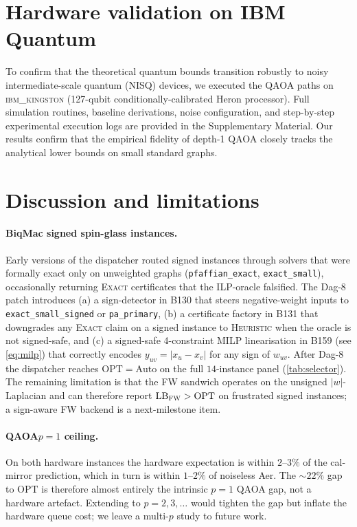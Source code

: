 \documentclass{article}
\theoremstyle{definition}
\theoremstyle{remark}
\newcommand{\QAOA}{\textsc{QAOA}\xspace}
\newcommand{\ILP}{\textsc{ILP}\xspace}
\newcommand{\FW}{\textsc{FW}\xspace}
\newcommand{\OPT}{\mathrm{OPT}}
\newcommand{\LB}{\mathrm{LB}}
\begin{document}
\section{Hardware validation on IBM Quantum}
\label{sec:hardware}
To confirm that the theoretical quantum bounds transition robustly to noisy intermediate-scale quantum (NISQ) devices, we executed the \QAOA paths on \textsc{ibm\_kingston} (127-qubit conditionally-calibrated Heron processor). Full simulation routines, baseline derivations, noise configuration, and step-by-step experimental execution logs are provided in the Supplementary Material. Our results confirm that the empirical fidelity of depth-1 QAOA closely tracks the analytical lower bounds on small standard graphs.

\section{Discussion and limitations}
\label{sec:discussion}

\paragraph{BiqMac signed spin-glass instances.} Early versions of the
dispatcher routed signed instances through solvers that were formally
exact only on unweighted graphs (\texttt{pfaffian\_exact},
\texttt{exact\_small}), occasionally returning \textsc{Exact}
certificates that the \ILP-oracle falsified. The Dag-8 patch introduces
(a) a sign-detector in B130 that steers negative-weight inputs to
\texttt{exact\_small\_signed} or \texttt{pa\_primary}, (b) a certificate
factory in B131 that downgrades any \textsc{Exact} claim on a signed
instance to \textsc{Heuristic} when the oracle is not signed-safe, and
(c) a signed-safe 4-constraint MILP linearisation in B159 (see
\cref{eq:milp}) that correctly encodes $y_{uv} = |x_u - x_v|$ for any
sign of $w_{uv}$. After Dag-8 the dispatcher reaches
$\OPT = \text{Auto}$ on the full $14$-instance panel
(\cref{tab:selector}). The remaining limitation is that the FW sandwich
operates on the unsigned $|w|$-Laplacian and can therefore report
$\LB_{\FW} > \OPT$ on frustrated signed instances; a sign-aware FW
backend is a next-milestone item.

\paragraph{\QAOA $p{=}1$ ceiling.} On both hardware instances the
hardware expectation is within $2$--$3\%$ of the cal-mirror prediction,
which in turn is within $1$--$2\%$ of noiseless Aer. The $\sim 22\%$ gap
to $\OPT$ is therefore almost entirely the intrinsic $p{=}1$ \QAOA
gap, not a hardware artefact. Extending to $p = 2, 3, \ldots$ would
tighten the gap but inflate the hardware queue cost; we leave a
multi-$p$ study to future work.
\end{document}
